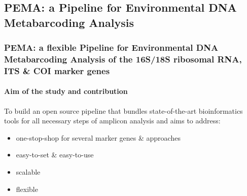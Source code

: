 \documentclass{beamer}
\begin{document}

   \begin{darkframes}
      \subsection{PEMA: a Pipeline for Environmental DNA Metabarcoding Analysis}
   \end{darkframes}
   
   \begin{darkframes}
      \begin{frame}
         \frametitle{PEMA: a flexible Pipeline for Environmental DNA Metabarcoding Analysis of the
         16S/18S ribosomal RNA, ITS \& COI marker genes}
         \framesubtitle{Aim of the study and contribution}

         To build an open source
         pipeline that bundles state-of-the-art bioinformatics tools for all necessary steps of
         amplicon analysis and aims to address:
         \begin{itemize}
            \item one-stop-shop for several marker genes \& approaches
            \item easy-to-set \& easy-to-use 
            \item scalable
            \item flexible
         \end{itemize}
      \end{frame}
   \end{darkframes}
\end{document}
